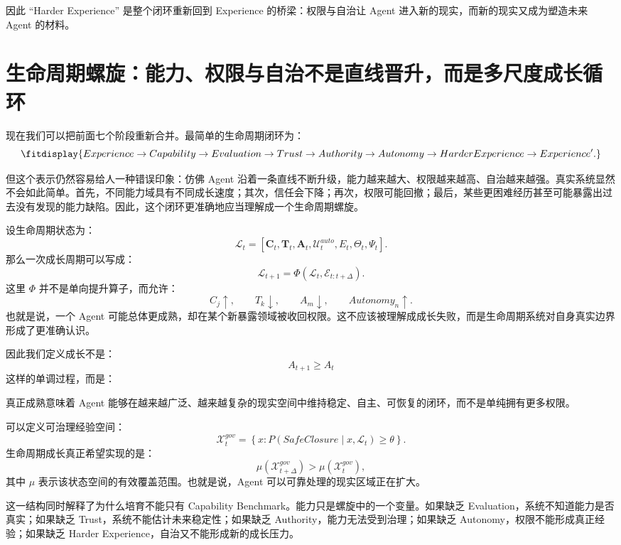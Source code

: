 因此 ``Harder Experience'' 是整个闭环重新回到 Experience 的桥梁：权限与自治让 Agent 进入新的现实，而新的现实又成为塑造未来 Agent 的材料。

\section{生命周期螺旋：能力、权限与自治不是直线晋升，而是多尺度成长循环}

现在我们可以把前面七个阶段重新合并。最简单的生命周期闭环为：
\[
\fitdisplay{
Experience
\rightarrow
Capability
\rightarrow
Evaluation
\rightarrow
Trust
\rightarrow
Authority
\rightarrow
Autonomy
\rightarrow
HarderExperience
\rightarrow
Experience'.
}
\]

但这个表示仍然容易给人一种错误印象：仿佛 Agent 沿着一条直线不断升级，能力越来越大、权限越来越高、自治越来越强。真实系统显然不会如此简单。首先，不同能力域具有不同成长速度；其次，信任会下降；再次，权限可能回撤；最后，某些更困难经历甚至可能暴露出过去没有发现的能力缺陷。因此，这个闭环更准确地应当理解成一个生命周期螺旋。

设生命周期状态为：
\[
\mathcal L_t
=
[
\mathbf C_t,
\mathbf T_t,
\mathbf A_t,
\mathcal U^{auto}_t,
E_t,
\Theta_t,
\Psi_t
].
\]
那么一次成长周期可以写成：
\[
\mathcal L_{t+1}
=
\Phi(
\mathcal L_t,
\mathcal E_{t:t+\Delta}
).
\]
这里 $\Phi$ 并不是单向提升算子，而允许：
\[
C_j\uparrow,\qquad
T_k\downarrow,\qquad
A_m\downarrow,\qquad
Autonomy_n\uparrow.
\]
也就是说，一个 Agent 可能总体更成熟，却在某个新暴露领域被收回权限。这不应该被理解成成长失败，而是生命周期系统对自身真实边界形成了更准确认识。

因此我们定义成长不是：
\[
A_{t+1}\geq A_t
\]
这样的单调过程，而是：
\begin{statementbox}
\centering
{}
\end{statementbox}
真正成熟意味着 Agent 能够在越来越广泛、越来越复杂的现实空间中维持稳定、自主、可恢复的闭环，而不是单纯拥有更多权限。

可以定义可治理经验空间：
\[
\mathcal X^{gov}_t
=
\left\{
x:
P(
SafeClosure
\mid
x,\mathcal L_t
)
\geq
\theta
\right\}.
\]
生命周期成长真正希望实现的是：
\[
\mu(
\mathcal X^{gov}_{t+\Delta}
)
>
\mu(
\mathcal X^{gov}_t
),
\]
其中 $\mu$ 表示该状态空间的有效覆盖范围。也就是说，Agent 可以可靠处理的现实区域正在扩大。

这一结构同时解释了为什么培育不能只有 Capability Benchmark。能力只是螺旋中的一个变量。如果缺乏 Evaluation，系统不知道能力是否真实；如果缺乏 Trust，系统不能估计未来稳定性；如果缺乏 Authority，能力无法受到治理；如果缺乏 Autonomy，权限不能形成真正经验；如果缺乏 Harder Experience，自治又不能形成新的成长压力。


